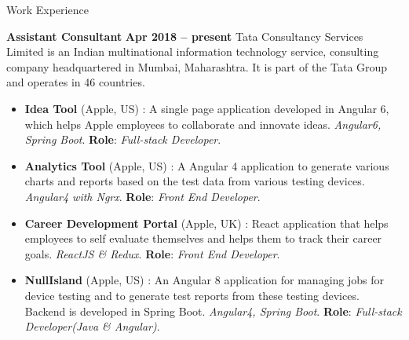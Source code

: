 \documentclass{resume}
\begin{document}
\begin{category}{Work Experience}
  
  \citemnobullet \textbf{Assistant Consultant} \hfill \textbf{Apr 2018 -- present}
  \citemnobullet Tata Consultancy Services Limited is an Indian multinational information technology service, consulting company headquartered in Mumbai, Maharashtra. It is part of the Tata Group and operates in 46 countries.
  \begin{itemize}
  \item \textbf{Idea Tool} (Apple, US) : A single page application developed in Angular 6, which helps Apple employees to collaborate and innovate ideas. {\em Angular6, Spring Boot}. \textbf{Role}: {\em Full-stack Developer}. 
  \item \textbf{Analytics Tool} (Apple, US) : A Angular 4 application to generate various charts and reports based on the test data from various testing devices. {\em Angular4 with Ngrx}. \textbf{Role}: {\em Front End Developer}. 
  \item \textbf{Career Development Portal} (Apple, UK) : React application that helps employees to self evaluate themselves and helps them to track their career goals. {\em ReactJS \& Redux}. \textbf{Role}: {\em Front End Developer}. 
  \item \textbf{NullIsland} (Apple, US) : An Angular 8 application for managing jobs for device testing and to generate test reports from these testing devices. Backend is developed in Spring Boot. {\em Angular4, Spring Boot}. \textbf{Role}: {\em Full-stack Developer(Java \& Angular)}. 
  \end{itemize}


\end{category}
\end{document}
